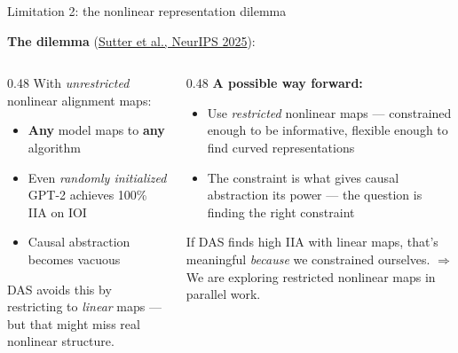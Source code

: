 \documentclass[10pt,aspectratio=169]{beamer}
\begin{document}
\begin{frame}{Limitation 2: the nonlinear representation dilemma}

\textbf{The dilemma} (\href{https://arxiv.org/abs/2507.08802}{Sutter et al., NeurIPS 2025}):

\vspace{0.3em}
\begin{columns}[T]
\begin{column}{0.48\textwidth}
With \emph{unrestricted} nonlinear alignment maps:
\begin{itemize}
  \item \textbf{Any} model maps to \textbf{any} algorithm
  \item Even \emph{randomly initialized} GPT-2 achieves 100\% IIA on IOI
  \item Causal abstraction becomes vacuous
\end{itemize}

\vspace{0.3em}
DAS avoids this by restricting to \emph{linear} maps --- but that might miss real nonlinear structure.
\end{column}

\begin{column}{0.48\textwidth}
\textbf{A possible way forward:}
\begin{itemize}
  \item Use \emph{restricted} nonlinear maps --- constrained enough to be informative, flexible enough to find curved representations
  \item The constraint is what gives causal abstraction its power --- the question is finding the right constraint
\end{itemize}

\vspace{0.3em}
If DAS finds high IIA with linear maps, that's meaningful \emph{because} we constrained ourselves. $\Rightarrow$ We are exploring restricted nonlinear maps in parallel work.
\end{column}
\end{columns}
\end{frame}
\end{document}
